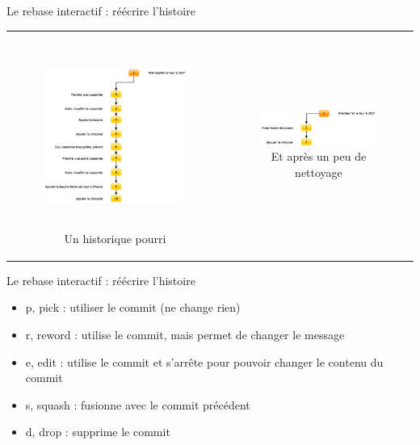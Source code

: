 \documentclass[xcolor=x11names,compress]{beamer}
\begin{document}
\begin{frame}{Le rebase interactif : réécrire l'histoire}
	\begin{tabular}{cc}
		\begin{minipage}{0.5\textwidth}
	\begin{figure}[H]
		\includegraphics[height=6cm]{images/3-collaboration/rebaseinteractif.eps}
		\caption{Un historique pourri}
	\end{figure}
\end{minipage}
	&
	\begin{minipage}{0.5\textwidth}
		\pause
	\begin{figure}[H]
		\includegraphics[width=5cm]{images/3-collaboration/rebaseinteractif_2.eps}
		\caption{Et après un peu de nettoyage}
	\end{figure}
\end{minipage}
	\end{tabular}
\end{frame}
\begin{frame}{Le rebase interactif : réécrire l'histoire}
	\begin{itemize}
		\item p, pick : utiliser le commit (ne change rien)
		\item r, reword : utilise le commit, mais permet de changer le message
		\item e, edit : utilise le commit et s'arrête pour pouvoir changer le contenu du commit
		\item s, squash : fusionne avec le commit précédent
		\item d, drop : supprime le commit
	\end{itemize}
\end{frame}
\end{document}
